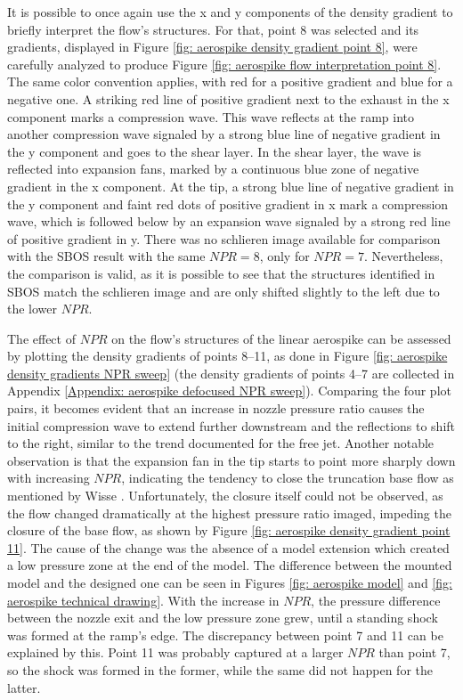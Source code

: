 It is possible to once again use the x and y components of the density gradient to briefly interpret the flow's structures. For that, point 8 was selected and its gradients, displayed in Figure \ref{fig: aerospike density gradient point 8}, were carefully analyzed to produce Figure \ref{fig: aerospike flow interpretation point 8}. The same color convention applies, with red for a positive gradient and blue for a negative one. A striking red line of positive gradient next to the exhaust in the x component marks a compression wave. This wave reflects at the ramp into another compression wave signaled by a strong blue line of negative gradient in the y component and goes to the shear layer. In the shear layer, the wave is reflected into expansion fans, marked by a continuous blue zone of negative gradient in the x component. At the tip, a strong blue line of negative gradient in the y component and faint red dots of positive gradient in x mark a compression wave, which is followed below by an expansion wave signaled by a strong red line of positive gradient in y. There was no schlieren image available for comparison with the SBOS result with the same $NPR = 8$, only for $NPR = 7$. Nevertheless, the comparison is valid, as it is possible to see that the structures identified in SBOS match the schlieren image and are only shifted slightly to the left due to the lower $NPR$.

The effect of $NPR$ on the flow's structures of the linear aerospike can be assessed by plotting the density gradients of points 8--11, as done in Figure \ref{fig: aerospike density gradients NPR sweep} (the density gradients of points 4--7 are collected in Appendix \ref{Appendix: aerospike defocused NPR sweep}). Comparing the four plot pairs, it becomes evident that an increase in nozzle pressure ratio causes the initial compression wave to extend further downstream and the reflections to shift to the right, similar to the trend documented for the free jet. Another notable observation is that the expansion fan in the tip starts to point more sharply down with increasing $NPR$, indicating the tendency to close the truncation base flow as mentioned by Wisse \cite{Wisse2005}. Unfortunately, the closure itself could not be observed, as the flow changed dramatically at the highest pressure ratio imaged, impeding the closure of the base flow, as shown by Figure \ref{fig: aerospike density gradient point 11}. The cause of the change was the absence of a model extension which created a low pressure zone at the end of the model. The difference between the mounted model and the designed one can be seen in Figures \ref{fig: aerospike model} and \ref{fig: aerospike technical drawing}. With the increase in $NPR$, the pressure difference between the nozzle exit and the low pressure zone grew, until a standing shock was formed at the ramp's edge. The discrepancy between point 7 and 11 can be explained by this. Point 11 was probably captured at a larger $NPR$ than point 7, so the shock was formed in the former, while the same did not happen for the latter.

